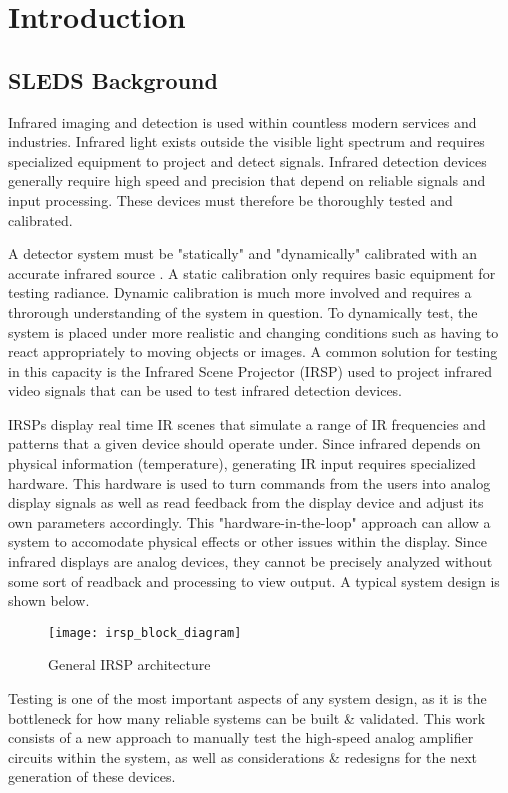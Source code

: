 %
%
\chapter{Introduction}

\section{SLEDS Background}

Infrared imaging and detection is used within countless modern services and industries. Infrared light exists outside the visible light spectrum and requires specialized equipment to project and detect signals. Infrared detection devices generally require high speed and precision that depend on reliable signals and input processing. These devices must therefore be thoroughly tested and calibrated. \par
A detector system must be "statically" and "dynamically" calibrated with an accurate infrared source \cite{marks}. A static calibration only requires basic equipment for testing radiance. Dynamic calibration is much more involved and requires a throrough understanding of the system in question. To dynamically test, the system is placed under more realistic and changing conditions such as having to react appropriately to moving objects or images. A common solution for testing in this capacity is the Infrared Scene Projector (IRSP) used to project infrared video signals that can be used to test infrared detection devices. \par
IRSPs display real time IR scenes that simulate a range of IR frequencies and patterns that a given device should operate under. Since infrared depends on physical information (temperature), generating IR input requires specialized hardware. This hardware is used to turn commands from the users into analog display signals as well as read feedback from the display device and adjust its own parameters accordingly. This "hardware-in-the-loop" approach can allow a system to accomodate physical effects or other issues within the display. Since infrared displays are analog devices, they cannot be precisely analyzed without some sort of readback and processing to view output. A typical system design is shown below. \par
\begin{figure}[!htb]
	\texttt{[image: irsp\_block\_diagram]}
	\centering
	\caption{General IRSP architecture}
	\centering
\end{figure}
Testing is one of the most important aspects of any system design, as it is the bottleneck for how many reliable systems can be built \& validated. This work consists of a new approach to manually test the high-speed analog amplifier circuits within the system, as well as considerations \& redesigns for the next generation of these devices.

